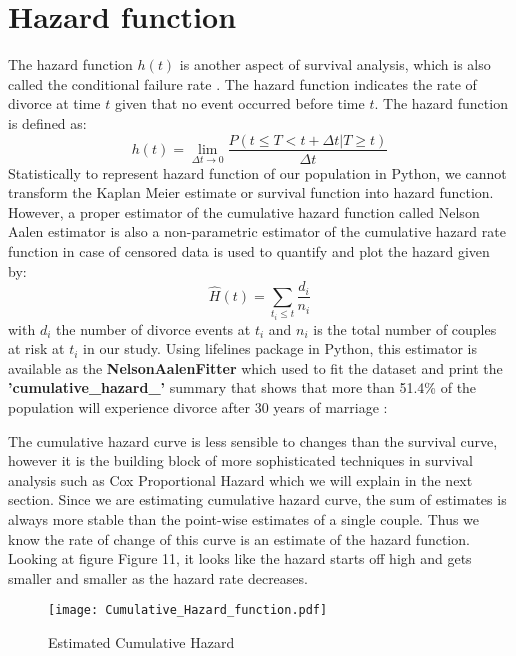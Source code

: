 \documentclass[10pt,twocolumn]{article}
\begin{document}
 \section{Hazard function}
The hazard function $h(t)$ is another aspect of survival analysis, which is also called the conditional failure rate \cite{dunn2009basic}. The hazard function indicates the rate of divorce at time $t$ given that no event occurred before time $t$. The hazard function is defined as:
\begin{equation}
h(t) = \lim_{\Delta{t} \to 0} \frac{P(t \leq T < t+\Delta{t} | T \geq t)}{\Delta{t}} 
\end{equation}
Statistically to represent hazard function of  our population in Python, we cannot transform the Kaplan Meier estimate or survival function into hazard function. However, a proper estimator of the cumulative hazard function called Nelson Aalen estimator is also a non-parametric estimator of the cumulative hazard rate function in case of censored data is used to quantify and plot the hazard given by:
\begin{equation}
\hat{H}(t) = \sum_{t_i \leq t} \frac{d_i}{n_i} 
\end{equation}
with $ d_{i}$ the number of divorce events at $ t_{i}$  and $n_{i}$  is the total number of couples at risk at $t_{i}$ in our study. Using lifelines package in Python, this estimator is available as the \textbf{NelsonAalenFitter} which used to fit the dataset and print the \textbf{'cumulative\_hazard\_'} summary that shows that more than 51.4\% of the population will experience divorce after 30 years of marriage :

The cumulative hazard curve is less sensible to changes than the survival curve, however it is the building block of more sophisticated techniques in survival analysis such as Cox Proportional Hazard which we will explain in the next section. Since we are estimating cumulative hazard curve, the sum of estimates is always more stable than the point-wise estimates of a single couple. Thus we know the rate of change of this curve is an estimate of the hazard function.\\ Looking at figure Figure 11, it looks like the hazard starts off high and gets smaller and smaller as the hazard rate decreases.
\begin{figure}[!htb]
\centering
\texttt{[image: Cumulative\_Hazard\_function.pdf]}
\caption{Estimated Cumulative Hazard}
\label{Fig:Estimated Cumulative Hazard}
\end{figure}
\end{document}
